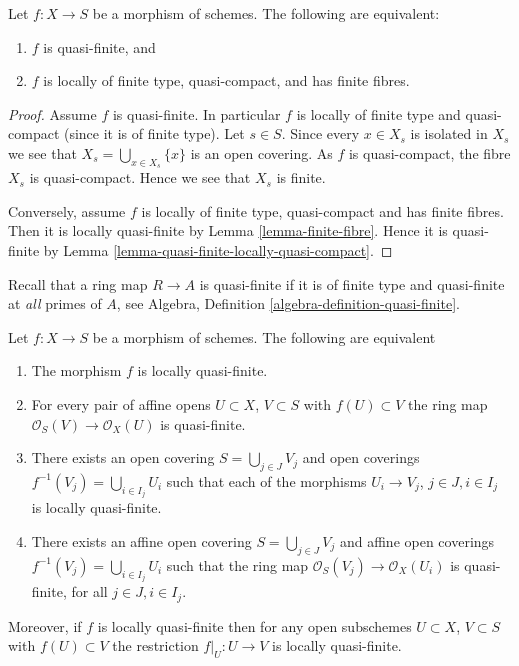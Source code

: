 \begin{lemma}
\label{lemma-quasi-finite}
Let $f : X \to S$ be a morphism of schemes.
The following are equivalent:
\begin{enumerate}
\item $f$ is quasi-finite, and
\item $f$ is locally of finite type, quasi-compact, and has finite fibres.
\end{enumerate}
\end{lemma}

\begin{proof}
Assume $f$ is quasi-finite. In particular $f$ is locally of finite type
and quasi-compact (since it is of finite type). Let $s \in S$. Since
every $x \in X_s$ is isolated in $X_s$ we see that
$X_s = \bigcup_{x \in X_s} \{x\}$ is an open covering. As $f$
is quasi-compact, the fibre $X_s$ is quasi-compact. Hence we see
that $X_s$ is finite.

\medskip\noindent
Conversely, assume $f$ is locally of finite type, quasi-compact
and has finite fibres. Then it is locally quasi-finite by
Lemma \ref{lemma-finite-fibre}. Hence it is quasi-finite by
Lemma \ref{lemma-quasi-finite-locally-quasi-compact}.
\end{proof}

\noindent
Recall that a ring map $R \to A$ is quasi-finite if it is
of finite type and quasi-finite at {\it all} primes of $A$, see
Algebra, Definition \ref{algebra-definition-quasi-finite}.

\begin{lemma}
\label{lemma-locally-quasi-finite-characterize}
Let $f : X \to S$ be a morphism of schemes.
The following are equivalent
\begin{enumerate}
\item The morphism $f$ is locally quasi-finite.
\item For every pair of affine opens $U \subset X$, $V \subset S$
with $f(U) \subset V$ the ring map
$\mathcal{O}_S(V) \to \mathcal{O}_X(U)$ is quasi-finite.
\item There exists an open covering $S = \bigcup_{j \in J} V_j$
and open coverings $f^{-1}(V_j) = \bigcup_{i \in I_j} U_i$ such
that each of the morphisms $U_i \to V_j$, $j\in J, i\in I_j$
is locally quasi-finite.
\item There exists an affine open covering $S = \bigcup_{j \in J} V_j$
and affine open coverings $f^{-1}(V_j) = \bigcup_{i \in I_j} U_i$ such
that the ring map $\mathcal{O}_S(V_j) \to \mathcal{O}_X(U_i)$ is
quasi-finite, for all $j\in J, i\in I_j$.
\end{enumerate}
Moreover, if $f$ is locally quasi-finite then for
any open subschemes $U \subset X$, $V \subset S$ with $f(U) \subset V$
the restriction $f|_U : U \to V$ is locally quasi-finite.
\end{lemma}

